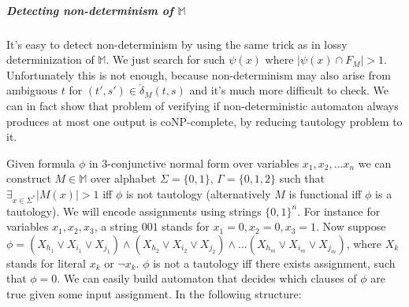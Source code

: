 \documentclass[12pt]{article}
\begin{document}
\subparagraph{Detecting non-determinism  of $\mathbb{M}$}
It's easy to detect non-determinism by using the same trick as in lossy determinization of  $\mathbb{M}$. We just search for such $\psi(x)$ where $\vert\psi(x) \cap F_M\vert > 1$. Unfortunately this is not enough, because non-determinism may also arise from ambiguous  $t$ for $(t',s') \in \check{\delta}_M(t,s)$ and it's much more difficult to check. We can in fact show that problem of verifying if non-deterministic automaton always produces at most one output is coNP-complete, by reducing tautology problem to it. 

Given formula $\phi$ in 3-conjunctive normal form over variables $x_1,x_2,...x_n$ we can construct $M \in \mathbb{ M}$ over alphabet $\Sigma=\{0,1\}$, $\Gamma=\{0,1,2\}$ such that $\exists_{x\in\Sigma^*}\vert M(x) \vert >1$ iff $\phi$ is not tautology (alternatively $M$ is functional iff $\phi$ is a tautology).  We will encode assignments using strings $\{0,1\}^n$. For instance for variables $x_1,x_2,x_3$, a string $001$ stands for $x_1=0,x_2=0,x_3=1$. Now suppose $\phi = (X_{h_1}\vee X_{i_1}\vee X_{j_1}) \wedge(X_{h_2}\vee X_{i_2}\vee X_{j_2}) \wedge ... (X_{h_m}\vee X_{i_m}\vee X_{j_m})$, where $X_k$ stands for literal $x_k$ or $\neg x_k$. $\phi$ is not a tautology iff there exists assignment, such that $\phi=0$. 
We can easily build automaton that decides which clauses of $\phi$ are true given some input assignment. In the following structure:
\end{document}
